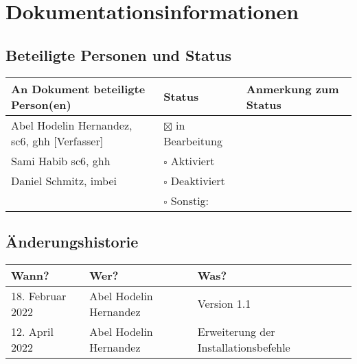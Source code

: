 \chapter{Dokumentationsinformationen}

\section{Beteiligte Personen und Status}
\begin{table}[ht]
	\centering  	
	\begin{tabular}{||l|l|l||}   		
		\hline
		An Dokument beteiligte Person(en) & Status & Anmerkung zum Status \\
		\hline\hline
		Abel Hodelin Hernandez, \acs{sc6}, \acs{ghh} [Verfasser] &  $\boxtimes$ in Bearbeitung & \\
		
		Sami Habib \acs{sc6}, \acs{ghh} & $\square$ Aktiviert & \\
		
		Daniel Schmitz, \acs{imbei} & $\square$ Deaktiviert &  \\
		
		& $\square$ Sonstig: &   \\
		\hline
	\end{tabular}
\end{table}

\section{Änderungshistorie}

\begin{table}[ht]
	\centering  	
	\begin{tabular}{||l|l|l||}   		
		\hline
		Wann? & Wer? & Was? \\
		\hline\hline
		18. Februar 2022 &  Abel Hodelin Hernandez & Version 1.1 \\
		\hline
		12. April 2022 &  Abel Hodelin Hernandez & Erweiterung der Installationsbefehle \\
		\hline
	\end{tabular}
\end{table}